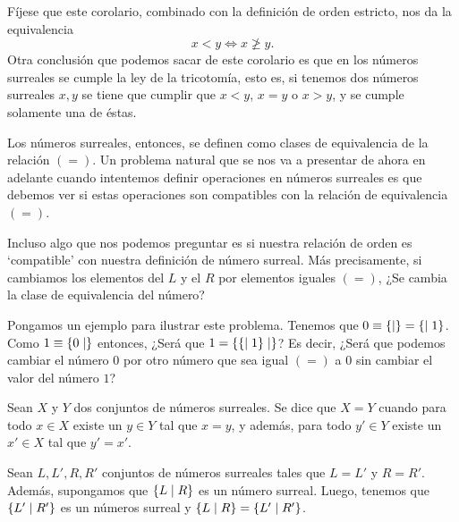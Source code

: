     F\'ijese que este corolario, combinado con la definici\'on de orden estricto, nos da la equivalencia 
    \[
        x < y\Leftrightarrow x \not\ge y.
    \]
    Otra conclusi\'on que podemos sacar de este corolario es que en los n\'umeros surreales se cumple la ley de la tricotom\'ia, esto es, si tenemos dos n\'umeros surreales $x,y$ se tiene que cumplir que $x < y$, $x = y$ o $x > y$, y se cumple solamente una de \'estas.

    Los n\'umeros surreales, entonces, se definen como clases de equivalencia de la relaci\'on $(=)$. Un problema natural que se nos va a presentar de ahora en adelante cuando intentemos definir operaciones en n\'umeros surreales es que debemos ver si estas operaciones son compatibles con la relaci\'on de equivalencia $(=)$.    

    Incluso algo que nos podemos preguntar es si nuestra relaci\'on de orden es `compatible' con nuestra definici\'on de n\'umero surreal. M\'as precisamente, si cambiamos los elementos del $L$ y el $R$ por elementos iguales $(=)$, ¿Se cambia la clase de equivalencia del n\'umero?

    Pongamos un ejemplo para ilustrar este problema. Tenemos que $0\equiv \left\{\mid \right\} = \left\{\mid 1\right\}$. Como $1\equiv \left\{0\mid \right\}$ entonces, ¿Ser\'a que $1 = \left\{\left\{\mid 1\right\}\mid \right\}$? Es decir, ¿Ser\'a que podemos cambiar el n\'umero $0$ por otro n\'umero que sea igual $(=)$ a $0$ sin cambiar el valor del n\'umero $1$?

    \begin{definition}
        Sean $X$ y $Y$ dos conjuntos de n\'umeros surreales. Se dice que $X=Y$ cuando para todo $x\in X$ existe un $y\in Y$ tal que $x=y$, y adem\'as, para todo $y'\in Y$ existe un $x'\in X$ tal que $y'=x'$.
    \end{definition}

    \begin{theorem}
        Sean $L,L',R, R'$ conjuntos de n\'umeros surreales tales que $L = L'$ y $R = R'$. Adem\'as, supongamos que $\left\{L\mid R\right\}$ es un n\'umero surreal. Luego, tenemos que $\left\{L'\mid R'\right\}$ es un n\'umeros surreal y $\left\{L\mid R\right\} = \left\{L'\mid R'\right\}$.
    \end{theorem}


